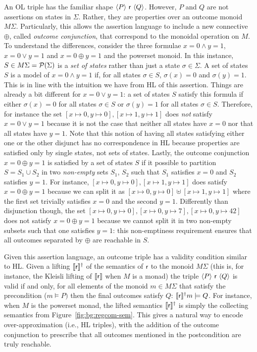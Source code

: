 An OL triple has the familiar shape $\langle {P}\rangle~\mathsf{r}~\langle{Q}\rangle$. However, $P$ and $Q$ are not assertions on states in $\Sigma$. Rather, they are properties over an outcome monoid $M \Sigma$. Particularly, this allows the assertion language to include a new connective $\oplus$, called \emph{outcome conjunction}, that correspond to the monoidal operation on $M$.
To understand the differences, consider the three formulae $x = 0 \land y = 1$, $x = 0 \lor y = 1$ and $x = 0 \oplus y = 1$ and the powerset monoid. In this instance, $S \in M \Sigma = \mathcal{P}(\Sigma)$ is a \emph{set of states} rather than just a state $\sigma \in \Sigma$. A set of states $S$ is a model of $x = 0 \land y = 1$ if, for all states $\sigma \in S$, $\sigma(x) = 0$ and $\sigma(y) = 1$. This is in line with the intuition we have from HL of this assertion. Things are already a bit different for $x = 0 \lor y = 1$: a set of states $S$ satisfy this formula if either $\sigma(x) = 0$ for all states $\sigma \in S$ or $\sigma(y) =1$ for all states $\sigma \in S$. Therefore, for instance the set ${[x \mapsto 0, y \mapsto 0], [x \mapsto 1, y \mapsto 1]}$ does \emph{not} satisfy $x = 0 \lor y = 1$ because it is not the case that neither all states have $x = 0$ nor that all states have $y = 1$. Note that this notion of having all states satisfying either one or the other disjunct has no correspondence in HL because properties are satisfied only by single states, not sets of states. Lastly, the outcome conjunction $x = 0 \oplus y = 1$ is satisfied by a set of states $S$ if it possible to partition $S = S_1 \cup S_2$ in two \emph{non-empty} sets $S_1$, $S_2$ such that $S_1$ satisfies $x = 0$ and $S_2$ satisfies $y = 1$. For instance,  ${[x \mapsto 0, y \mapsto 0], [x \mapsto 1, y \mapsto 1]}$ does satisfy $x = 0 \oplus y = 1$ because we can split it as ${[x \mapsto 0, y \mapsto 0]} \uplus {[x \mapsto 1, y \mapsto 1]}$ where the first set trivially satisfies $x = 0$ and the second $y = 1$. Differently than disjunction though, the set ${[x \mapsto 0, y \mapsto 0], [x \mapsto 0, y \mapsto 7], [x \mapsto 0, y \mapsto 42]}$ does not satisfy $x = 0 \oplus y = 1$ because we cannot split it in two non-empty subsets such that one satisfies $y = 1$: this non-emptiness requirement ensures that all outcomes separated by $\oplus$ are reachable in $S$.

Given this assertion language, an outcome triple has a validity condition similar to HL. Given a lifting $\llbracket\mathsf{r}\rrbracket^{\dagger}$ of the semantics of $\mathsf{r}$ to the monoid $M \Sigma$ (this is, for instance, the Kleisli lifting of $\llbracket\mathsf{r}\rrbracket$ when $M$ is a monad) the triple $\langle {P}\rangle~\mathsf{r}~\langle{Q}\rangle$ is valid if and only, for all elements of the monoid $m \in M \Sigma$ that satisfy the precondition ($m \models P)$ then the final outcomes satisfy $Q$: $\llbracket\mathsf{r}\rrbracket^{\dagger} m \models Q$. For instance, when $M$ is the powerset monad, the lifted semantics $\llbracket\mathsf{r}\rrbracket^{\dagger}$ is simply the collecting semantics from Figure~\ref{fig:bg:regcom-sem}. This gives a natural way to encode over-approximation (i.e., HL triples), with the addition of the outcome conjunction to prescribe that all outcomes mentioned in the postcondition are truly reachable.


